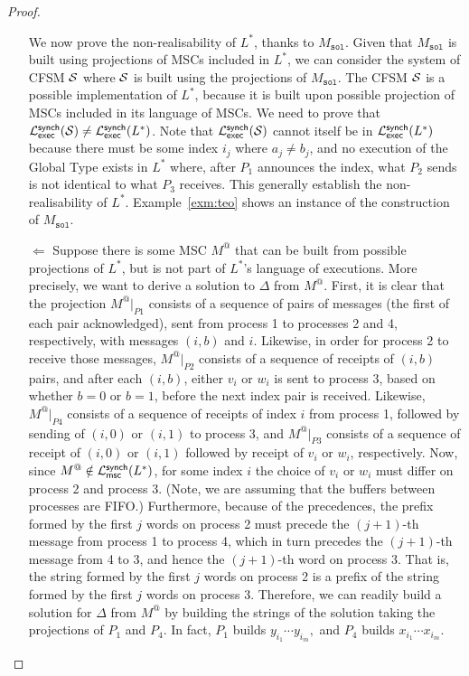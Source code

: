 \begin{proof}
\begin{itemize}
			  We now prove the non-realisability of $L^*$, thanks to $M_{\texttt{sol}}$.
			  Given that $M_{\texttt{sol}}$ is built using projections of MSCs 
			  included in $L^*$, we can consider the system of CFSM $\mathcal{S}$
			  where $\mathcal{S}$ is built using the projections of $M_{\texttt{sol}}$. 
			  The CFSM $\mathcal{S}$ is a possible implementation of $L^*$, because it 
			  is built upon possible projection of MSCs included in its language of MSCs.
			  We need to prove that 	
			  $\mathcal{L}_{\mathsf{exec}}^{\mathsf{synch}}(\mathcal{S}) \neq \mathcal{L}_{\mathsf{exec}}^{\mathsf{synch}}(L^*)$.
		      Note that $\mathcal{L}_{\mathsf{exec}}^{\mathsf{synch}}(\mathcal{S})$ cannot 
			  itself be in $\mathcal{L}_{\mathsf{exec}}^{\mathsf{synch}}(L^*)$ because there must be
		      some index $i_j$ where $a_j \neq b_j$, and no execution of the Global 
			  Type exists in $L^*$ where,
		      after $P_1$ announces the index, what $P_2$ sends is not
		      identical to what $P_3$ receives. This generally establish the
			  non-realisability of $L^*$. Example~\ref{exm:teo} shows an instance
			  of the construction of $M_{\texttt{sol}}$.

		\item[$\Leftarrow$]
		      Suppose there is some MSC $M^@$ that can be built from possible 
			  projections of $L^*$, but is not part of $L^*$'s language
			  of executions. 
			  More precisely, we want to derive a solution to $\Delta$ from $M^@$.
		      First, it is clear that the projection $M^@|_{P1}$ consists of a sequence
		      of pairs of messages (the first of each pair acknowledged), sent from
		      process 1 to processes 2 and 4, respectively, with messages $(i, b)$ and $i$.
		      Likewise, in order for process 2 to receive those messages,
		      $M^@|_{P2}$ consists of a sequence of receipts of $(i, b)$ pairs, and after
		      each $(i, b)$, either $v_i$ or $w_i$ is sent to process 3, based on whether
		      $b = 0$ or $b = 1$, before the next index pair is received.
		      Likewise, $M^@|_{P4}$ consists of a sequence of receipts of index $i$ from
		      process 1, followed by sending of $(i, 0)$ or $(i, 1)$ to process 3, and
		      $M^@|_{P3}$ consists of a sequence of receipt of $(i, 0)$ or $(i, 1)$ followed
		      by receipt of $v_i$ or $w_i$, respectively.
		      Now, since $M^@\notin \mathcal{L}_{\mathsf{msc}}^{\mathsf{synch}}(L^*)$, for some index $i$ the choice of $v_i$ or
		      $w_i$ must differ on process 2 and process 3. (Note, we are assuming that
		      the buffers between processes are FIFO.)
		      Furthermore, because of the precedences, the prefix formed by the first
		      $j$ words on process 2 must precede the $(j + 1)$-th message from
		      process 1 to process 4, which in turn precedes the $(j + 1)$-th message
		      from 4 to 3, and hence the $(j + 1)$-th word on process 3. That is, the
		      string formed by the first $j$ words on process 2 is a prefix of the string
		      formed by the first $j$ words on process 3. Therefore, we can readily
		      build a solution for $\Delta$ from $M^@$ by building the strings of the solution
		      taking the projections of $P_1$ and $P_4$. In fact, $P_1$ builds 
			  $y_{i_1}\cdots y_{i_m},$ and $P_4$ builds $x_{i_1}\cdots x_{i_m}$.


\end{itemize}
\end{proof}
